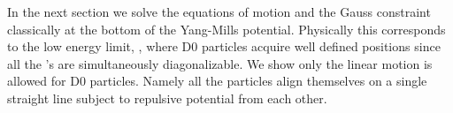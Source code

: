 \documentclass[a4paper,12pt]{article}
\begin{document}
In the next section  we solve the equations of motion and the Gauss constraint classically at the bottom of the
Yang-Mills potential. Physically this corresponds to the low energy limit, \coordHE{},
where D0 particles acquire well defined positions since all the \coordHE{}'s are simultaneously diagonalizable. We show only
the linear motion is allowed for D0 particles.  Namely all the particles align themselves on a single straight
line subject to \coordHE{} repulsive potential from each other.












\end{document}

